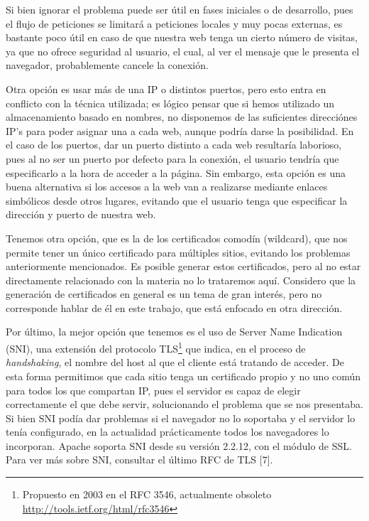 \documentclass[a4paper, 10pt]{article} %
\begin{document}
Si bien ignorar el problema puede ser útil en fases iniciales o de desarrollo, pues el flujo de peticiones se limitará a peticiones locales y muy pocas externas, es bastante poco útil en caso de que nuestra web tenga un cierto número de visitas, ya que no ofrece seguridad al usuario, el cual, al ver el mensaje que le presenta el navegador, probablemente cancele la conexión. 

Otra opción es usar más de una IP o distintos puertos, pero esto entra en conflicto con la técnica utilizada; es lógico pensar que si hemos utilizado un almacenamiento basado en nombres, no disponemos de las suficientes direcciónes IP's para poder asignar una a cada web, aunque podría darse la posibilidad. En el caso de los puertos, dar un puerto distinto a cada web resultaría laborioso, pues al no ser un puerto por defecto para la conexión, el usuario tendría que especificarlo a la hora de acceder a la página. Sin embargo, esta opción es una buena alternativa si los accesos a la web van a realizarse mediante enlaces simbólicos desde otros lugares, evitando que el usuario tenga que especificar la dirección y puerto de nuestra web.

Tenemos otra opción, que es la de los certificados comodín (wildcard), que nos permite tener un único certificado para múltiples sitios, evitando los problemas anteriormente mencionados. Es posible generar estos certificados, pero al no estar directamente relacionado con la materia no lo trataremos aquí. Considero que la generación de certificados en general es un tema de gran interés, pero no corresponde hablar de él en este trabajo, que está enfocado en otra dirección.

Por último, la mejor opción que tenemos es el uso de Server Name Indication (SNI), una extensión del protocolo TLS\footnote{Propuesto en 2003 en el RFC 3546, actualmente obsoleto \url{http://tools.ietf.org/html/rfc3546}} que indica, en el proceso de \textit{handshaking}, el nombre del host al que el cliente está tratando de acceder. De esta forma permitimos que cada sitio tenga un certificado propio y no uno común para todos los que compartan IP, pues el servidor es capaz de elegir correctamente el que debe servir, solucionando el problema que se nos presentaba. Si bien SNI podía dar problemas si el navegador no lo soportaba y el servidor lo tenía configurado, en la actualidad prácticamente todos los navegadores lo incorporan. Apache soporta SNI desde su versión 2.2.12, con el módulo de SSL. \\
Para ver más sobre SNI, consultar el último RFC de TLS [7].
\end{document}
